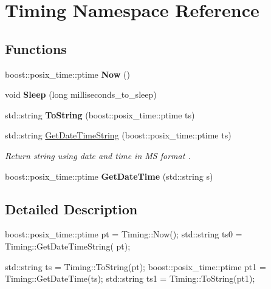 \hypertarget{namespace_timing}{}\section{Timing Namespace Reference}
\label{namespace_timing}
\subsection*{Functions}
\begin{DoxyCompactItemize}
\item 
\hypertarget{namespace_timing_a57bc8e0e4215527dcf959ae6b353dab5}{}boost\+::posix\+\_\+time\+::ptime {\bfseries Now} ()\label{namespace_timing_a57bc8e0e4215527dcf959ae6b353dab5}

\item 
\hypertarget{namespace_timing_ac1c9edcc14a668527d8f6efef74519ae}{}void {\bfseries Sleep} (long milliseconds\+\_\+to\+\_\+sleep)\label{namespace_timing_ac1c9edcc14a668527d8f6efef74519ae}

\item 
\hypertarget{namespace_timing_ad156562286ba463256e864eb0435718c}{}std\+::string {\bfseries To\+String} (boost\+::posix\+\_\+time\+::ptime ts)\label{namespace_timing_ad156562286ba463256e864eb0435718c}

\item 
\hypertarget{namespace_timing_a68b2243bee8c0da56da11fd526b1411b}{}std\+::string \hyperlink{namespace_timing_a68b2243bee8c0da56da11fd526b1411b}{Get\+Date\+Time\+String} (boost\+::posix\+\_\+time\+::ptime ts)\label{namespace_timing_a68b2243bee8c0da56da11fd526b1411b}

\begin{DoxyCompactList}\small\item\em Return string using date and time in M\+S format . \end{DoxyCompactList}\item 
\hypertarget{namespace_timing_a686560c767a653d76c33535b24d01ade}{}boost\+::posix\+\_\+time\+::ptime {\bfseries Get\+Date\+Time} (std\+::string s)\label{namespace_timing_a686560c767a653d76c33535b24d01ade}

\end{DoxyCompactItemize}


\subsection{Detailed Description}
boost\+::posix\+\_\+time\+::ptime pt = Timing\+::\+Now(); std\+::string ts0 = Timing\+::\+Get\+Date\+Time\+String( pt);

std\+::string ts = Timing\+::\+To\+String(pt); boost\+::posix\+\_\+time\+::ptime pt1 = Timing\+::\+Get\+Date\+Time(ts); std\+::string ts1 = Timing\+::\+To\+String(pt1); 